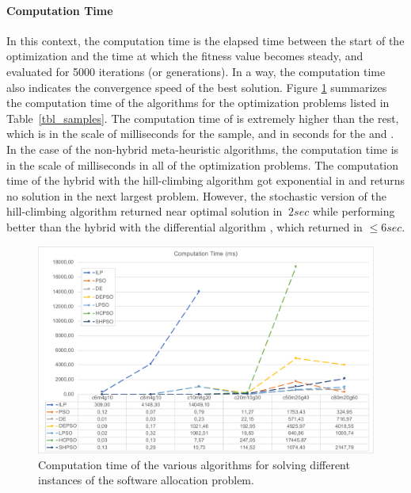 \paragraph{Computation Time} In this context, the computation time is the elapsed time between the start of the optimization and the time at which the fitness value becomes steady, and evaluated for 5000 iterations (or generations). In a way, the computation time also indicates the convergence speed of the best solution. Figure \ref{fig_allocationtime_ilp_metaheuristic} summarizes the computation time of the algorithms for the optimization problems listed in Table~\ref{tbl_samples}. The computation time of \ilp is extremely higher than the rest, which is in the scale of milliseconds for the  sample, and in seconds for the  and . In the case of the non-hybrid meta-heuristic algorithms, the computation time is in the scale of milliseconds in all of the optimization problems. The computation time of the hybrid \pso{} with the hill-climbing algorithm \hcpso{} got exponential in  and returns no solution in the next largest problem. However, the stochastic version of the hill-climbing algorithm returned near optimal solution in $~2sec$ while performing better than the hybrid \pso{} with the differential algorithm \depso, which returned in $\leq 6sec$.
\begin{figure}
\centering
\includegraphics[width=1\linewidth]{img/time_summary.pdf}
\caption{Computation time of the various algorithms for solving different instances of the software allocation problem.}
\label{fig_allocationtime_ilp_metaheuristic}\vspace{-0.4cm}
\end{figure}

